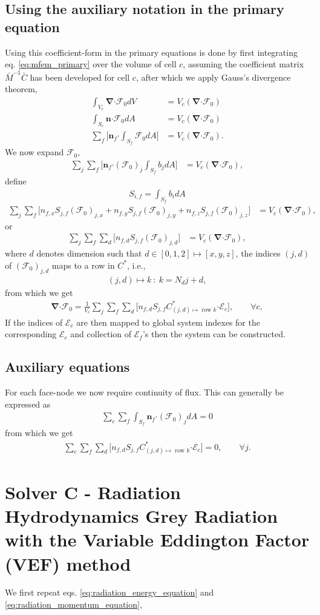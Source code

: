 \documentclass[10pt,letterpaper,notitlepage]{article}
\numberwithin{equation}{section}
\newcommand{\bnabla}{\boldsymbol{\nabla}}
\newcommand{\dotp}{\boldsymbol{\cdot}}
\newcommand{\RadE}{\mathcal{E}}
\newcommand{\RadF}{\boldsymbol{\mathcal{F}}}
\newcommand{\RadJ}{\RadF_0}
\newcommand{\beqn}{\begin{equation}\begin{aligned}}
\newcommand{\eeqn}{\end{aligned}\end{equation}}
\begin{document}
\subsection{Using the auxiliary notation in the primary equation}
Using this coefficient-form in the primary equations is done by first integrating eq. \eqref{eq:mfem_primary} over the volume of cell $c$, assuming the coefficient matrix $\bar{M}^{-1} \bar{C}$ has been developed for cell $c$, after which we apply Gauss's divergence theorem,
\beqn 
\int_{V_c} \bnabla \dotp \RadJ dV &= V_c ( \bnabla \dotp \RadJ) \\
\int_{S_c} \mathbf{n} \dotp \RadJ dA &= V_c  ( \bnabla \dotp \RadJ)\\
\sum_f \biggr[ \mathbf{n}_f \dotp \int_{S_f} \RadJ dA \biggr] &= V_c ( \bnabla \dotp \RadJ).
\eeqn 
We now expand $\RadJ$,
\beqn 
\sum_j \sum_f \biggr[ \mathbf{n}_f \dotp (\RadJ)_j \int_{S_f} b_j dA \biggr] &= V_c ( \bnabla \dotp \RadJ),
\eeqn 
define
\beqn 
S_{i,f} = \int_{S_f} b_i dA
\eeqn 
\beqn
\sum_j \sum_f \biggr[ 
n_{f,x} S_{j,f} (\RadJ)_{j,x} +
n_{f,y} S_{j,f} (\RadJ)_{j,y} +
n_{f,z} S_{j,f} (\RadJ)_{j,z}
\biggr] &= V_c ( \bnabla \dotp \RadJ),
\eeqn 
or
\beqn
\sum_j \sum_f \sum_d \biggr[ 
n_{f,d} S_{j,f} (\RadJ)_{j,d}
\biggr] &= V_c ( \bnabla \dotp \RadJ),
\eeqn 
where $d$ denotes dimension such that $d\in[0,1,2] \mapsto [x,y,z]$, the indices $(j,d)$ of $(\RadJ)_{j,d}$ maps to a row in $C^*$, i.e., 
\beqn 
(j,d) \mapsto k \ : \ k=N_d j + d,
\eeqn 
from which we get
\beqn
\bnabla \dotp \RadJ = \frac{1}{V_c}
\sum_j \sum_f \sum_d \biggr[ 
n_{f,d} S_{j,f} C_{(j,d)\mapsto \text{ row } k}^* \dotp \boldsymbol{\RadE}_c
\biggr], \quad \quad \forall c,
\eeqn 
If the indices of $\RadE_c$ are then mapped to global system indexes for the corresponding $\RadE_c$ and collection of $\RadE_f$'s then the system can be constructed.


\subsection{Auxiliary equations}
For each face-node we now require continuity of flux. This can generally be expressed as
\beqn 
\sum_c \sum_f \int_{S_f} \mathbf{n}_f \dotp (\RadF_0)_j dA = 0
\eeqn 
from which we get
\beqn 
\sum_c \sum_f \sum_d  \biggr[ n_{f,d} S_{j,f} C_{(j,d)\mapsto \text{ row } k}^* \dotp \boldsymbol{\RadE}_c \biggr] = 0,
\quad \quad \forall j.
\eeqn 


\newpage 
\section{Solver C - Radiation Hydrodynamics Grey Radiation with the Variable Eddington Factor (VEF) method}
We first repeat eqs. \eqref{eq:radiation_energy_equation} and \eqref{eq:radiation_momentum_equation},
\end{document}
